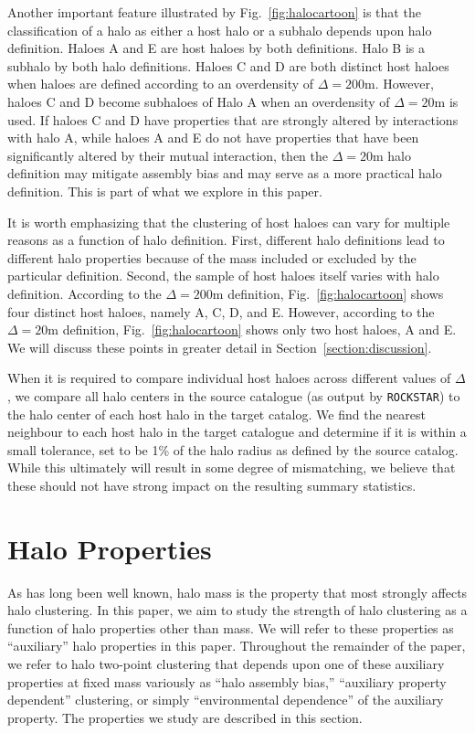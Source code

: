 \documentclass[usenatbib,fleqn]{mnras}
\begin{document}
Another important feature illustrated by Fig.~\ref{fig:halocartoon} is that the classification of a halo as either a host halo or a subhalo depends upon halo definition. Haloes A and E are host haloes by both definitions. Halo B is a subhalo by both halo definitions. Haloes C and D are both distinct host haloes when haloes are defined according to an overdensity of $\Delta=200$m. However, haloes C and D become subhaloes of Halo A when an overdensity of $\Delta=20$m is used. If haloes C and D have properties that are strongly altered by interactions with halo A, while haloes A and E do not have properties that have been significantly altered by their mutual interaction, then the $\Delta=20$m halo definition may mitigate assembly bias and may serve as a more practical halo definition. This is part of what we explore in this paper.

It is worth emphasizing that the clustering of host haloes can vary for multiple reasons as a function of halo definition. First, different halo definitions lead to different halo properties because of the mass included or excluded by the particular definition. Second, the sample of host haloes itself varies with halo definition. According to the $\Delta=200$m definition, Fig.~\ref{fig:halocartoon} shows four distinct host haloes, namely A, C, D, and E. However, according to the $\Delta=20$m definition, Fig.~\ref{fig:halocartoon} shows only two host haloes, A and E. We will discuss these points in greater detail in Section~\ref{section:discussion}.

When it is required to compare individual host haloes across different values of $\Delta$, we compare all halo centers in the source catalogue (as output by {\tt ROCKSTAR}) to the halo center of each host halo in the target catalog. We find the nearest neighbour to each host halo in the target catalogue and determine if it is within a small tolerance, set to be 1\% of the halo radius as defined by the source catalog. While this ultimately will result in some degree of mismatching, we believe that these should not have strong impact on the resulting summary statistics.


\section{Halo Properties}
\label{section:haloprops}

As has long been well known, halo mass is the property that most strongly affects halo clustering. In this paper, we aim to study the strength of halo clustering as a function of halo properties other than mass. We will refer to these properties as ``auxiliary'' halo properties in this paper. Throughout the remainder of the paper, we refer to halo two-point clustering that depends upon one of these auxiliary properties at fixed mass variously as ``halo assembly bias,'' ``auxiliary property dependent'' clustering, or simply ``environmental dependence'' of the auxiliary property. The properties we study are described in this section.
\end{document}

